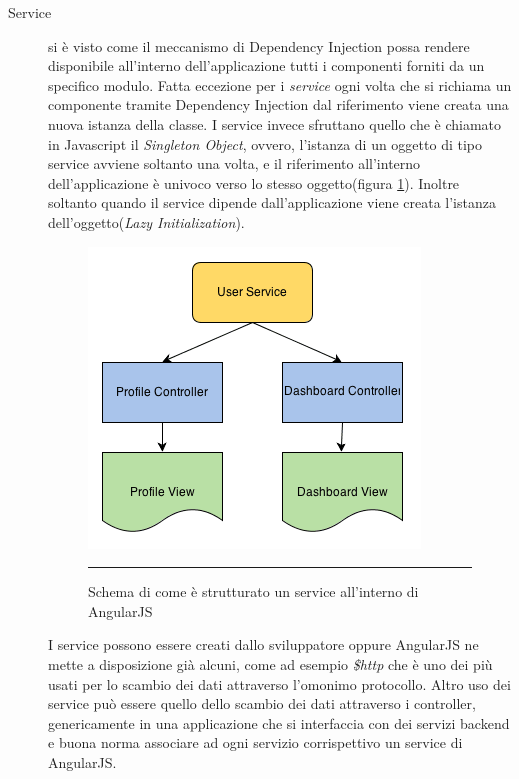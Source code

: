 \begin{description}
\begin{code}[caption = {Un esempio di creazione di un modulo e la sua inclusione all'interno di un altro}, 
				   label = {lst:controllerExample}]
\end{code}

\item[Service] si è visto come il meccanismo di Dependency Injection possa rendere disponibile all'interno dell'applicazione tutti i componenti forniti da un specifico modulo. Fatta eccezione per i \emph{service} ogni volta che si richiama un componente tramite Dependency Injection dal riferimento viene creata una nuova istanza della classe. I service invece sfruttano quello che è chiamato in Javascript il \emph{Singleton Object}, ovvero, l'istanza di un oggetto di tipo service avviene soltanto una volta, e il riferimento all'interno dell'applicazione è univoco verso lo stesso oggetto(figura \ref{fig:AngularJS-Singleton}). Inoltre soltanto quando il service dipende dall'applicazione viene creata l'istanza dell'oggetto(\emph{Lazy Initialization}).

\begin{figure}[htbp]
  \centering
    \includegraphics[scale=0.75]{Figures/angularjs-service-singleton-diagram.png}  
    \rule{35em}{0.5pt}
  \caption[AngularJS Singleton]{Schema di come è strutturato un service all'interno di AngularJS}
  \label{fig:AngularJS-Singleton}
\end{figure}

I service possono essere creati dallo sviluppatore oppure AngularJS ne mette a disposizione già alcuni, come ad esempio \emph{\$http} che è uno dei più usati per lo scambio dei dati attraverso l'omonimo protocollo. Altro uso dei service può essere quello dello scambio dei dati attraverso i controller, genericamente in una applicazione che si interfaccia con dei servizi backend e buona norma associare ad ogni servizio corrispettivo un service di AngularJS.


\end{description}
